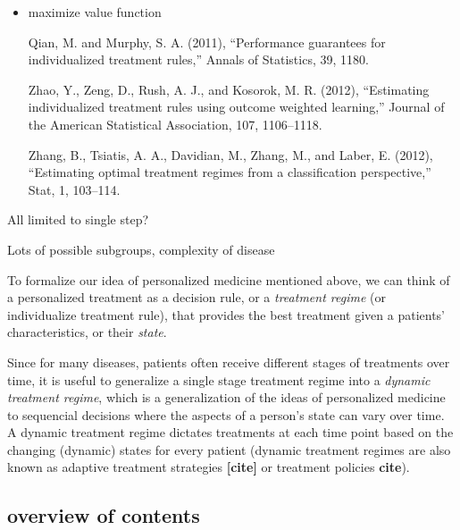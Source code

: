 \documentclass[12pt]{article}
\begin{document}
\begin{itemize}
  \item maximize value function
  
  Qian, M. and Murphy, S. A. (2011), “Performance guarantees for individualized treatment rules,” Annals of Statistics, 39, 1180.
  
  Zhao, Y., Zeng, D., Rush, A. J., and Kosorok, M. R. (2012), “Estimating individualized treatment rules using outcome weighted learning,” Journal of the American Statistical Association, 107, 1106–1118.
  
  Zhang, B., Tsiatis, A. A., Davidian, M., Zhang, M., and Laber, E. (2012), “Estimating optimal treatment regimes from a classification perspective,” Stat, 1, 103–114.
\end{itemize}

All limited to single step?


Lots of possible subgroups, complexity of disease


To formalize our idea of personalized medicine mentioned above, we can think of a personalized treatment as a decision rule, or a \emph{treatment regime} (or individualize treatment rule), that provides the best treatment given a patients' characteristics, or their \emph{state}.

Since for many diseases, patients often receive different stages of treatments over time, it is useful to generalize a single stage treatment regime into
a \emph{dynamic treatment regime}, which is a generalization of the ideas of personalized medicine to sequencial decisions where the aspects of a person's state can vary over time. A dynamic treatment regime dictates treatments at each time point based on the changing (dynamic) states for every patient (dynamic treatment regimes are also known as adaptive treatment strategies \textbf{[cite]} or treatment policies \textbf{cite}).



\subsection{overview of contents} %
\label{sub:overview_of_contents_of_thesis}
\end{document}
